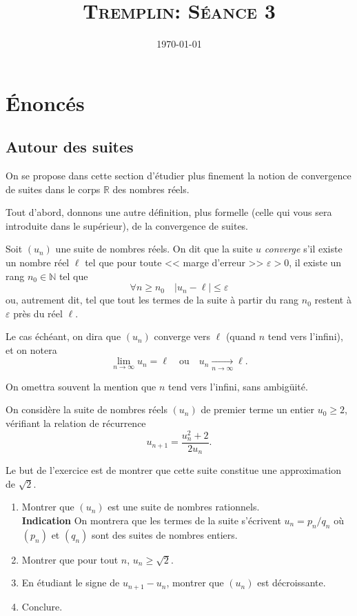 \documentclass[12pt]{article}
\title{\textsc{Tremplin: Séance 3}}
\date{\today}
\author{}
\newcommand{\RR}{\mathbb R}
\newcommand{\NN}{\mathbb N}
\renewcommand{\epsilon}{\varepsilon}
\theoremstyle{definition}
\begin{document}
\maketitle

\section*{Énoncés}

\subsection*{Autour des suites}

On se propose dans cette section d'étudier plus finement la notion de convergence de suites dans le corps $\RR$ des nombres réels.

Tout d'abord, donnons une autre définition, plus formelle (celle qui vous sera introduite dans le supérieur), de la convergence de suites.

\begin{defn}
Soit $(u_n)$ une suite de nombres réels. On dit que la suite $u$ \emph{converge} s'il existe un nombre réel $\ell$ tel que pour toute << marge d'erreur >> $\epsilon > 0$, il existe un rang $n_0\in\NN$ tel que
\[
\forall n\geq n_0\quad
|u_n - \ell| \leq \epsilon
\]
ou, autrement dit, tel que tout les termes de la suite à partir du rang $n_0$ restent à $\epsilon$ près du réel $\ell$.

Le cas échéant, on dira que $(u_n)$ converge vers $\ell$ (quand $n$ tend vers l'infini), et on notera
\[
\lim_{n\to\infty} u_n = \ell\quad \text{ou}\quad u_n\xrightarrow[n\to\infty]{}\ell.
\]

On omettra souvent la mention que $n$ tend vers l'infini, sans ambigüité.
\end{defn}

\begin{exer}
	On considère la suite de nombres réels $(u_n)$ de premier terme un entier $u_0\geq 2$, vérifiant la relation de récurrence \[
	u_{n+1} = \frac{u_n^2+2}{2u_n}.
	\]
	
	Le but de l'exercice est de montrer que cette suite constitue une approximation de $\sqrt{2}$.
	\begin{enumerate}
		\item Montrer que $(u_n)$ est une suite de nombres rationnels.\\
		\textbf{Indication} On montrera que les termes de la suite s'écrivent $u_n = p_n/q_n$ où $(p_n)$ et $(q_n)$ sont des suites de nombres entiers.
		\item Montrer que pour tout $n$, $u_n \geq \sqrt 2$.
		\item En étudiant le signe de $u_{n+1} - u_n$, montrer que $(u_n)$ est décroissante.
		\item Conclure.
	\end{enumerate}
\end{exer}
\end{document}
